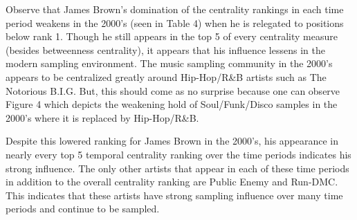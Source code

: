 \documentclass[pageno]{jpaper}
\begin{document}
\begin{table}[H]
\caption{Top Artists by Centrality (2000's)}
\label{table:table4}
\end{table}
Observe that James Brown's domination of the centrality rankings in each time period weakens in the 2000's (seen in Table 4) when he is relegated to positions below rank 1. Though he still appears in the top 5 of every centrality measure (besides betweenness centrality), it appears that his influence lessens in the modern sampling environment. The music sampling community in the 2000's appears to be centralized greatly around Hip-Hop/R\&B artists such as The Notorious B.I.G. But, this should come as no surprise because one can observe Figure 4 which depicts the weakening hold of Soul/Funk/Disco samples in the 2000's where it is replaced by Hip-Hop/R\&B.

Despite this lowered ranking for James Brown in the 2000's, his appearance in nearly every top 5 temporal centrality ranking over the time periods indicates his strong influence. The only other artists that appear in each of these time periods in addition to the overall centrality ranking are Public Enemy and Run-DMC. This indicates that these artists have strong sampling influence over many time periods and continue to be sampled.
\end{document}
